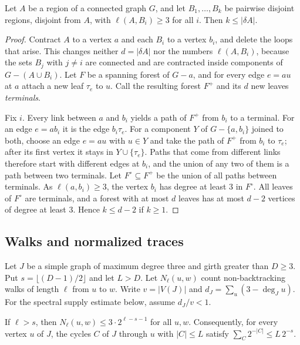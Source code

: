 \begin{lemma}\label{lem:exc}
Let $A$ be a region of a connected graph $G$, and let $B_1,\dots,B_k$ be pairwise disjoint regions,
disjoint from $A$, with $\ell(A,B_i)\ge3$ for all $i$. Then $k\le|\delta A|$.
\end{lemma}

\begin{proof}
Contract $A$ to a vertex $a$ and each $B_i$ to a vertex $b_i$, and delete the loops that arise.
This changes neither $d=|\delta A|$ nor the numbers $\ell(A,B_i)$, because the sets $B_j$ with
$j\ne i$ are connected and are contracted inside components of $G-(A\cup B_i)$. Let $F$ be a spanning forest of
$G-a$, and for every edge $e=au$ at $a$ attach a new leaf $\tau_e$ to $u$. Call the resulting forest
$F^{+}$ and its $d$ new leaves \emph{terminals}.

Fix $i$. Every link between $a$ and $b_i$ yields a path of $F^{+}$ from $b_i$ to a terminal. For an
edge $e=ab_i$ it is the edge $b_i\tau_e$. For a component $Y$ of $G-\{a,b_i\}$ joined to both, choose
an edge $e=au$ with $u\in Y$ and take the path of $F^{+}$ from $b_i$ to $\tau_e$; after its first
vertex it stays in $Y\cup\{\tau_e\}$. Paths that come from different links therefore start with
different edges at $b_i$, and the union of any two of them is a path between two terminals. Let
$F^{\circ}\subseteq F^{+}$ be the union of all paths between terminals. As $\ell(a,b_i)\ge3$, the
vertex $b_i$ has degree at least $3$ in $F^{\circ}$. All leaves of $F^{\circ}$ are terminals, and a
forest with at most $d$ leaves has at most $d-2$ vertices of degree at least $3$. Hence $k\le d-2$ if $k\ge1$.
\end{proof}


\subsection{Walks and normalized traces}
Let $J$ be a simple graph of maximum degree three and girth greater than $D\ge3$.
Put $s=\lfloor(D-1)/2\rfloor$ and let $L>D$.
Let $N_\ell(u,w)$ count non-backtracking walks of length $\ell$ from $u$ to $w$.
Write $v=|V(J)|$ and $d_J=\sum_u(3-\deg_Ju)$.
For the spectral supply estimate below, assume $d_J/v<1$.

\begin{lemma}\label{lem:walks}
If $\ell>s$, then $N_\ell(u,w)\le3\cdot2^{\ell-s-1}$ for all $u,w$. Consequently, for every vertex
$u$ of $J$, the cycles $C$ of $J$ through $u$ with $|C|\le L$ satisfy $\sum_C2^{-|C|}\le L\,2^{-s}$.
\end{lemma}

